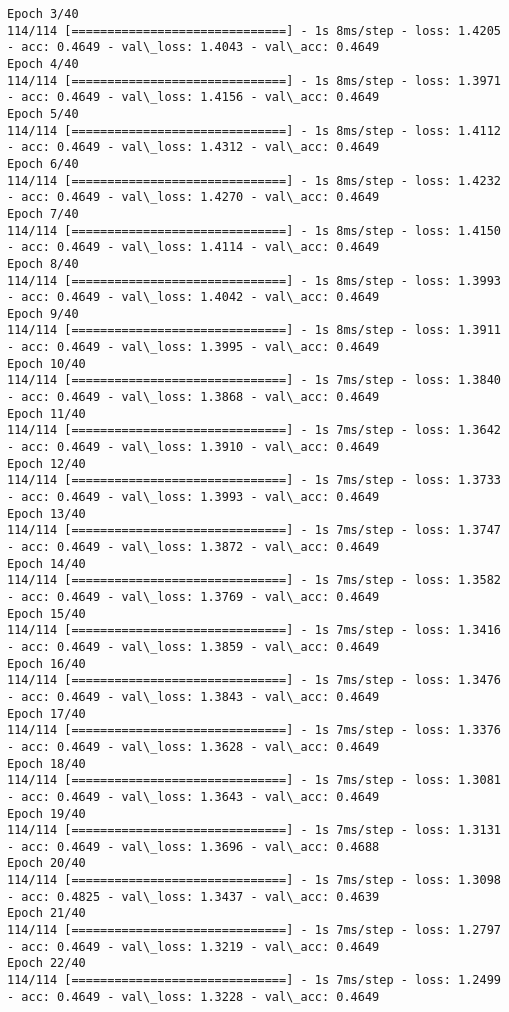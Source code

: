 \documentclass[11pt]{article}
\begin{document}
\begin{Verbatim}[commandchars=\\\{\}]
Epoch 3/40
114/114 [==============================] - 1s 8ms/step - loss: 1.4205 - acc: 0.4649 - val\_loss: 1.4043 - val\_acc: 0.4649
Epoch 4/40
114/114 [==============================] - 1s 8ms/step - loss: 1.3971 - acc: 0.4649 - val\_loss: 1.4156 - val\_acc: 0.4649
Epoch 5/40
114/114 [==============================] - 1s 8ms/step - loss: 1.4112 - acc: 0.4649 - val\_loss: 1.4312 - val\_acc: 0.4649
Epoch 6/40
114/114 [==============================] - 1s 8ms/step - loss: 1.4232 - acc: 0.4649 - val\_loss: 1.4270 - val\_acc: 0.4649
Epoch 7/40
114/114 [==============================] - 1s 8ms/step - loss: 1.4150 - acc: 0.4649 - val\_loss: 1.4114 - val\_acc: 0.4649
Epoch 8/40
114/114 [==============================] - 1s 8ms/step - loss: 1.3993 - acc: 0.4649 - val\_loss: 1.4042 - val\_acc: 0.4649
Epoch 9/40
114/114 [==============================] - 1s 8ms/step - loss: 1.3911 - acc: 0.4649 - val\_loss: 1.3995 - val\_acc: 0.4649
Epoch 10/40
114/114 [==============================] - 1s 7ms/step - loss: 1.3840 - acc: 0.4649 - val\_loss: 1.3868 - val\_acc: 0.4649
Epoch 11/40
114/114 [==============================] - 1s 7ms/step - loss: 1.3642 - acc: 0.4649 - val\_loss: 1.3910 - val\_acc: 0.4649
Epoch 12/40
114/114 [==============================] - 1s 7ms/step - loss: 1.3733 - acc: 0.4649 - val\_loss: 1.3993 - val\_acc: 0.4649
Epoch 13/40
114/114 [==============================] - 1s 7ms/step - loss: 1.3747 - acc: 0.4649 - val\_loss: 1.3872 - val\_acc: 0.4649
Epoch 14/40
114/114 [==============================] - 1s 7ms/step - loss: 1.3582 - acc: 0.4649 - val\_loss: 1.3769 - val\_acc: 0.4649
Epoch 15/40
114/114 [==============================] - 1s 7ms/step - loss: 1.3416 - acc: 0.4649 - val\_loss: 1.3859 - val\_acc: 0.4649
Epoch 16/40
114/114 [==============================] - 1s 7ms/step - loss: 1.3476 - acc: 0.4649 - val\_loss: 1.3843 - val\_acc: 0.4649
Epoch 17/40
114/114 [==============================] - 1s 7ms/step - loss: 1.3376 - acc: 0.4649 - val\_loss: 1.3628 - val\_acc: 0.4649
Epoch 18/40
114/114 [==============================] - 1s 7ms/step - loss: 1.3081 - acc: 0.4649 - val\_loss: 1.3643 - val\_acc: 0.4649
Epoch 19/40
114/114 [==============================] - 1s 7ms/step - loss: 1.3131 - acc: 0.4649 - val\_loss: 1.3696 - val\_acc: 0.4688
Epoch 20/40
114/114 [==============================] - 1s 7ms/step - loss: 1.3098 - acc: 0.4825 - val\_loss: 1.3437 - val\_acc: 0.4639
Epoch 21/40
114/114 [==============================] - 1s 7ms/step - loss: 1.2797 - acc: 0.4649 - val\_loss: 1.3219 - val\_acc: 0.4649
Epoch 22/40
114/114 [==============================] - 1s 7ms/step - loss: 1.2499 - acc: 0.4649 - val\_loss: 1.3228 - val\_acc: 0.4649

\end{Verbatim}
\end{document}
